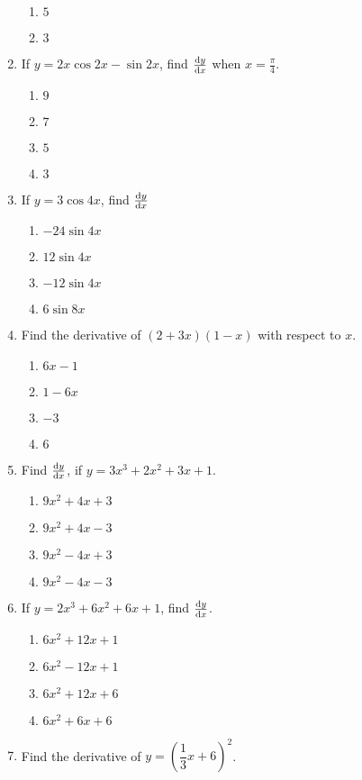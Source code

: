 \begin{multicols}{2}
\begin{enumerate}[label={\arabic*.}]
\begin{enumerate}[label={\Alph*.}]
	\item \(5\)
	\item \(3\)
	\end{enumerate}
\item If \(y= 2x\cos{2x} -\sin{2x}\), find \(\dv{y}{x}\) when \(x=\frac{\pi}{4}\).
	\begin{enumerate}[label={\Alph*.}]
	\item \(9\)
	\item \(7\)
	\item \(5\)
	\item \(3\)
	\end{enumerate}
\item If \(y=3\cos{4x}\), find \(\dv{y}{x}\)
	\begin{enumerate}[label={\Alph*.}]
	\item \(-24\sin{4x}\)
	\item \(12\sin{4x}\)
	\item \(-12 \sin{4x}\)
	\item \(6\sin{8x}\)
	\end{enumerate}
\item Find the derivative of \((2+3x)(1-x)\) with respect to \(x\).
	\begin{enumerate}[label={\Alph*.}]
	\item \(6x-1\)
	\item \(1-6x\)
	\item \(-3\)
	\item \(6\)
	\end{enumerate}
\item Find \(\dv{y}{x}\), if \(y = 3{x}^{3}+2{x}^{2}+3x+1\).
	\begin{enumerate}[label={\Alph*.}]
	\item \(9{x}^{2}+4{x}+3\)
	\item \(9{x}^{2}+4{x}-3\)
	\item \(9{x}^{2}-4{x}+3\)
	\item \(9{x}^{2}-4{x}-3\)
	\end{enumerate}
\item If \(y = 2{x}^{3}+6{x}^{2}+6x+1\), find \(\dv{y}{x}\).
	\begin{enumerate}[label={\Alph*.}]
	\item \(6{x}^{2}+12{x}+1\)
	\item \(6{x}^{2}-12{x}+1\)
	\item \(6{x}^{2}+12{x}+6\)
	\item \(6{x}^{2}+6{x}+6\)
	\end{enumerate}
\item Find the derivative of \(y ={\left(\dfrac{1}{3}x + 6\right)}^{2}\).

\end{enumerate}
\end{multicols}
